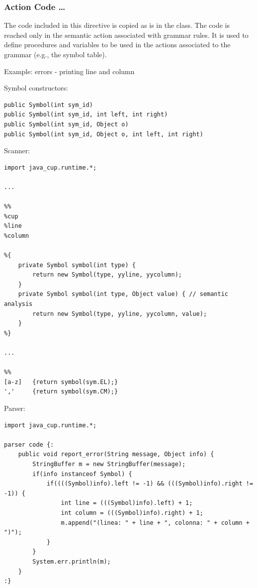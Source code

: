 \subsubsection{Action Code \code{\{:}\ldots\code{:\}}}
The code included in this directive is copied as is in the  class.
The code is reached only in the semantic action associated with grammar rules.
It is used to define procedures and variables to be used in the actions associated to the grammar (e.g., the symbol table).

Example: errors - printing line and column

Symbol constructors:
\begin{lstlisting}
public Symbol(int sym_id)
public Symbol(int sym_id, int left, int right)
public Symbol(int sym_id, Object o)
public Symbol(int sym_id, Object o, int left, int right)
\end{lstlisting}
Scanner:
\begin{lstlisting}[frame=single]
import java_cup.runtime.*;

...

%%
%cup
%line
%column

%{
    private Symbol symbol(int type) {
        return new Symbol(type, yyline, yycolumn);
    }
    private Symbol symbol(int type, Object value) { // semantic analysis
        return new Symbol(type, yyline, yycolumn, value);
    }
%}

...

%%
[a-z]   {return symbol(sym.EL);}
','     {return symbol(sym.CM);}
\end{lstlisting}
Parser:
\begin{lstlisting}[frame=single]
import java_cup.runtime.*;

parser code {:
    public void report_error(String message, Object info) {
        StringBuffer m = new StringBuffer(message);
        if(info instanceof Symbol) {
            if((((Symbol)info).left != -1) && (((Symbol)info).right != -1)) {
                int line = (((Symbol)info).left) + 1;
                int column = (((Symbol)info).right) + 1;
                m.append("(linea: " + line + ", colonna: " + column + ")");
            }
        }
        System.err.println(m);
    }
:}
\end{lstlisting}

